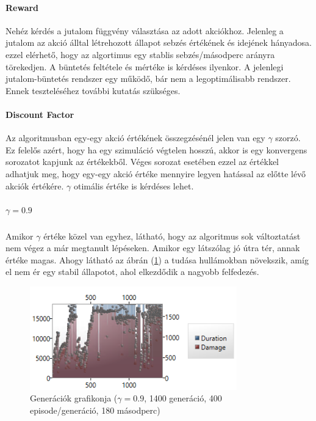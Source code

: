 \documentclass[12pt]{article}
\begin{document}
\paragraph{Reward} Nehéz kérdés a jutalom függvény választása az adott akciókhoz. Jelenleg a jutalom az akció álltal létrehozott állapot sebzés értékének és idejének hányadosa. ezzel elérhető, hogy az algortimus egy stablis sebzés/másodperc arányra törekedjen. A büntetés feltétele és mértéke is kérdéses ilyenkor. A jelenlegi jutalom-büntetés rendszer egy működő, bár nem a legoptimálisabb rendszer. Ennek teszteléséhez további kutatás szükséges.

\paragraph{Discount Factor} Az algoritmusban egy-egy akció értékének összegzésénél jelen van egy $\gamma$ szorzó. Ez felelős azért, hogy ha egy szimuláció végtelen hosszú, akkor is egy konvergens sorozatot kapjunk az értékekből. Véges sorozat esetében ezzel az értékkel adhatjuk meg, hogy egy-egy akció értéke mennyire legyen hatással az előtte lévő akciók értékére. $\gamma$ otimális értéke is kérdéses lehet.

\subparagraph{$\gamma = 0.9$}

Amikor $\gamma$ értéke közel van egyhez, látható, hogy az algoritmus sok változtatást nem végez a már megtanult lépéseken. Amikor egy látszólag jó útra tér, annak értéke magas. Ahogy látható az ábrán (\ref{fig:19gamma1400gen400ep1800dur}) a tudása hullámokban növekszik, amíg el nem ér egy stabil állapotot, ahol elkezdődik a nagyobb felfedezés.

\begin{figure}[H]
	\begin{center}
		\includegraphics[width=0.8\textwidth]{19gamma1400gen400ep1800dur}
	\end{center}
	\caption{Generációk grafikonja ($\gamma = 0.9$, 1400 generáció, 400 episode/generáció, 180 másodperc)}
	\label{fig:19gamma1400gen400ep1800dur}
\end{figure}
\end{document}

